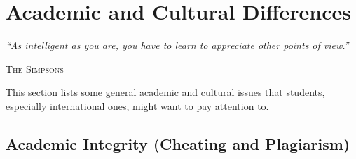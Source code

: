 \documentclass[oneside,11pt,dvipsnames]{book}
\newcommand{\myepigraphsimpsons}[1]{
\epigraph{\vspace{-0.2in} \emph{#1}}{\textsc{The Simpsons}}
}
\newenvironment{commentbox}[1][]{
  \small
  \begin{mybox}
    {\small \textbf{#1}}
  }{
  \end{mybox}
}
\begin{document}
    


\chapter{Academic and Cultural Differences}\label{sec:cultural}

\myepigraphsimpsons{``As intelligent as you are, you have to learn to appreciate other points of view.''}

This section lists some general academic and cultural issues that students, especially international ones, might want to pay attention to.


\section{Academic Integrity (Cheating and Plagiarism)}
\end{document}
